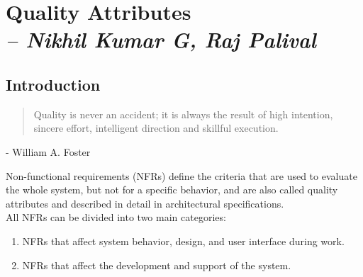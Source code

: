 \chapter{Quality Attributes\\
\small{\textit{-- Nikhil Kumar G, Raj Palival}}
\label{Chapter::Quality Attributes}}

\section{Introduction\label{Section::QAIntro}}
\begin{quote}
Quality is never an accident; it is always the result of high intention, sincere effort, intelligent direction and skillful execution. 
\end{quote}
\begin{flushright}
- William A. Foster
\end{flushright}
Non-functional requirements (NFRs) define the criteria that are used to evaluate the whole system, but not for a specific behavior, and are also called quality attributes and described in detail in architectural specifications.
\\
All NFRs can be divided into two main categories:
\begin{enumerate}
\item NFRs that affect system behavior, design, and user interface during work.
\item NFRs that affect the development and support of the system.
\end{enumerate}
